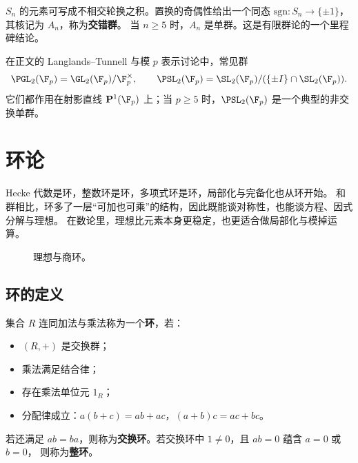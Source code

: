\begin{example}[对称群与交错群]
$S_n$ 的元素可写成不相交轮换之积。置换的奇偶性给出一个同态
$\mathrm{sgn}\colon S_n\to\{\pm 1\}$，其核记为 $A_n$，称为\textbf{交错群}。
当 $n\ge 5$ 时，$A_n$ 是单群。这是有限群论的一个里程碑结论。
\end{example}

\begin{example}
在正文的 Langlands--Tunnell 与模 $p$ 表示讨论中，常见群
\[
  \PGL_2(\F_p)=\GL_2(\F_p)/\F_p^\times,
  \qquad
  \PSL_2(\F_p)=\SL_2(\F_p)/(\{\pm I\}\cap \SL_2(\F_p)).
\]
它们都作用在射影直线 $\mathbf{P}^1(\F_p)$ 上；当 $p\ge 5$ 时，$\PSL_2(\F_p)$
是一个典型的非交换单群。
\end{example}

\section{环论}
\label{sec:app-ring-theory}

Hecke 代数是环，整数环是环，多项式环是环，局部化与完备化也从环开始。
和群相比，环多了一层“可加也可乘”的结构，因此既能谈对称性，也能谈方程、因式分解与理想。
在数论里，理想比元素本身更稳定，也更适合做局部化与模掉运算。

\begin{figure}[H]
\centering
{}
\caption{理想与商环。}
\end{figure}

\subsection{环的定义}

\begin{definition}[环]
集合 $R$ 连同加法与乘法称为一个\textbf{环}，若：
\begin{itemize}
  \item $(R,+)$ 是交换群；
  \item 乘法满足结合律；
  \item 存在乘法单位元 $1_R$；
  \item 分配律成立：$a(b+c)=ab+ac$，$(a+b)c=ac+bc$。
\end{itemize}
若还满足 $ab=ba$，则称为\textbf{交换环}。若交换环中 $1\neq 0$，且 $ab=0$ 蕴含 $a=0$ 或 $b=0$，
则称为\textbf{整环}。
\end{definition}

